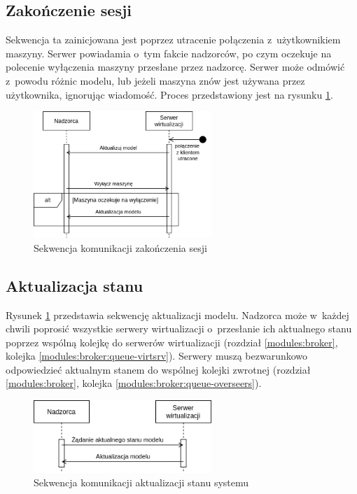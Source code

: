 \documentclass[../opis-rozwiazania.tex]{subfiles}
\begin{document}
\subsection{Zakończenie sesji}

Sekwencja ta zainicjowana jest poprzez utracenie połączenia z~użytkownikiem maszyny.
Serwer powiadamia o~tym fakcie nadzorców, po czym oczekuje na polecenie wyłączenia maszyny przesłane przez nadzorcę. Serwer może odmówić z~powodu różnic modelu, lub jeżeli maszyna znów jest używana przez użytkownika, ignorując wiadomość. Proces przedstawiony jest na rysunku \ref{figure:diagrams:sequence_diagrams:konczenie_sesji}.

\begin{figure}[ht!]
  \centering
  \includegraphics[width=0.6\textwidth]{../diagrams/sequence_diagrams/konczenie_sesji.png}
  \caption{Sekwencja komunikacji zakończenia sesji}
  \label{figure:diagrams:sequence_diagrams:konczenie_sesji}
\end{figure}

\subsection{Aktualizacja stanu}

Rysunek \ref{figure:diagrams:sequence_diagrams:konczenie_sesji} przedstawia sekwencję aktualizacji modelu. Nadzorca może w~każdej chwili poprosić wszystkie serwery wirtualizacji
o~przesłanie ich aktualnego stanu poprzez wspólną kolejkę do serwerów wirtualizacji (rozdział \ref{modules:broker}, kolejka \ref{modules:broker:queue-virtsrv}).
Serwery muszą bezwarunkowo odpowiedzieć aktualnym stanem do wspólnej kolejki zwrotnej (rozdział \ref{modules:broker}, kolejka \ref{modules:broker:queue-overseers}).

\begin{figure}[ht!]
  \centering
  \includegraphics[width=0.6\textwidth]{../diagrams/sequence_diagrams/aktualizacja_stanu.png}
  \caption{Sekwencja komunikacji aktualizacji stanu systemu}
  \label{figure:diagrams:sequence_diagrams:aktualizacja_stanu}
\end{figure}
\end{document}
